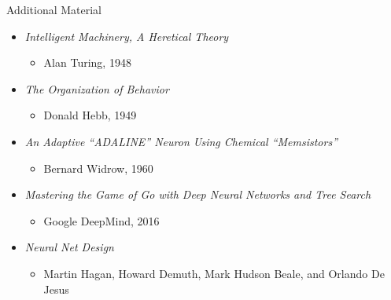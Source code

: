 \documentclass[11pt]{beamer}
\begin{document}
\begin{frame}{Additional Material}
\begin{itemize}
    \item[] \textit{Intelligent Machinery, A Heretical Theory}
        \begin{itemize} \item[] Alan Turing, 1948 \end{itemize}
    \item[] \textit{The Organization of Behavior}
        \begin{itemize} \item[] Donald Hebb, 1949 \end{itemize}
    \item[] \textit{An Adaptive “ADALINE” Neuron Using Chemical “Memsistors”}
        \begin{itemize} \item[] Bernard Widrow, 1960 \end{itemize}
    \item[] \textit{Mastering the Game of Go with Deep Neural Networks and Tree Search}
        \begin{itemize} \item[] Google DeepMind, 2016 \end{itemize}
    \item[] \textit{Neural Net Design}
        \begin{itemize} \item[] Martin Hagan, Howard Demuth, Mark Hudson Beale, and Orlando De Jesus \end{itemize}
\end{itemize}
\end{frame}
\end{document}
